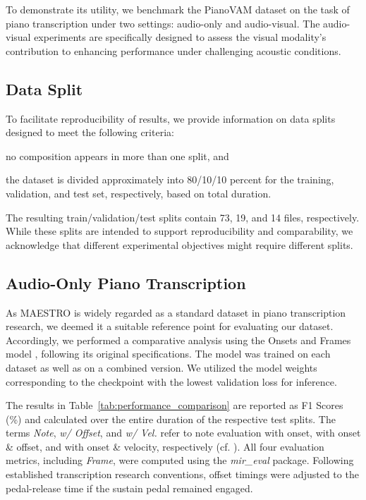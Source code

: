\documentclass{article}
\begin{document}
To demonstrate its utility, we benchmark the PianoVAM dataset on the task of piano transcription under two settings: audio-only and audio-visual. The audio-visual experiments are specifically designed to assess the visual modality's contribution to enhancing performance under challenging acoustic conditions.

\subsection{Data Split}
To facilitate reproducibility of results, we provide information on data splits designed to meet the following criteria: 
\begin{inparaenum}[(i)]
    \item no composition appears in more than one split, and 
    \item the dataset is divided approximately into 80/10/10 percent for the training, validation, and test set, respectively, based on total duration. 
\end{inparaenum}
The resulting train/validation/test splits contain 73, 19, and 14 files, respectively. While these splits are intended to support reproducibility and comparability, we acknowledge that different experimental objectives might require different splits.

\subsection{Audio-Only Piano Transcription}
As MAESTRO is widely regarded as a standard dataset in piano transcription research, we deemed it a suitable reference point for evaluating our dataset. Accordingly, we performed a comparative analysis using the Onsets and Frames model \cite{ISMIR18Hawthorne}, following its original specifications. The model was trained on each dataset as well as on a combined version. We utilized the model weights corresponding to the checkpoint with the lowest validation loss for inference. 

The results in Table~\ref{tab:performance_comparison} are reported as F1 Scores (\%) and calculated over the entire duration of the respective test splits. The terms \textit{Note}, \textit{w/ Offset}, and \textit{w/ Vel.} refer to note evaluation with onset, with onset \& offset, and with onset \& velocity, respectively (cf. \cite{TASLP21Kong}). All four evaluation metrics, including \textit{Frame}, were computed using the \textit{mir\_eval} package\cite{raffel2014mir_eval}. Following established transcription research conventions, offset timings were adjusted to the pedal-release time if the sustain pedal remained engaged.
\end{document}
